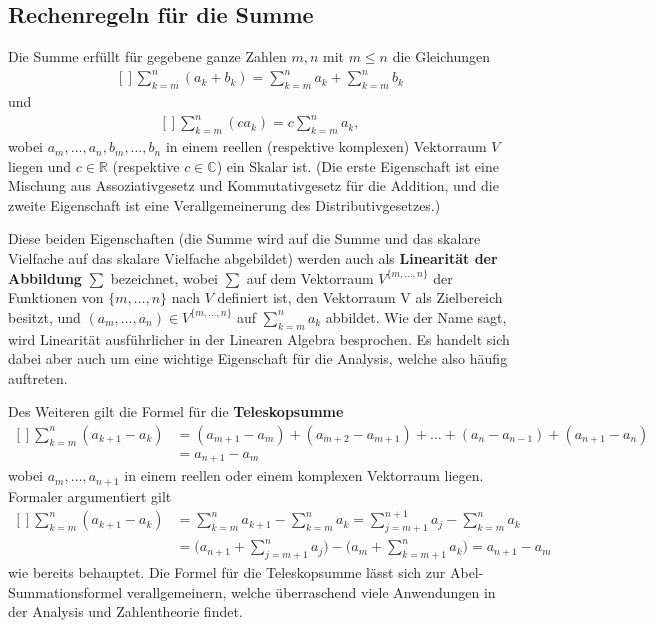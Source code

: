 \documentclass[../Analysis1_script.tex]{subfiles}
\begin{document}
\subsection{Rechenregeln für die Summe}

Die Summe erfüllt für gegebene ganze Zahlen $m,n$ mit $m \leq n$ die Gleichungen
\[\begin{aligned}[]
	\sum _{k=m}^n(a_k+b_k) = \sum _{k=m}^na_k + \sum _{k=m}^nb_k
\end{aligned}\]
und
\[\begin{aligned}[]
	\sum _{k=m}^n(ca_k) = c \sum _{k=m}^na_k,
\end{aligned}\] 
wobei $a_m,\ldots ,a_n, b_m,\ldots ,b_n$ in einem reellen (respektive komplexen) Vektorraum $V$ liegen und $c\in \mathbb {R}$ (respektive $c\in \mathbb {C}$) ein Skalar ist. (Die erste Eigenschaft ist eine Mischung aus Assoziativgesetz und Kommutativgesetz für die Addition, und die zweite Eigenschaft ist eine Verallgemeinerung des Distributivgesetzes.)

Diese beiden Eigenschaften (die Summe wird auf die Summe und das skalare Vielfache auf das skalare Vielfache abgebildet) werden auch als \textbf{Linearität der Abbildung} $\sum$ bezeichnet, wobei $\sum$ auf dem Vektorraum $V^{\{ m,\ldots ,n\} }$ der Funktionen von $\{ m,\ldots ,n\}$ nach $V$ definiert ist, den Vektorraum V als Zielbereich besitzt, und $(a_m,\ldots ,a_n)\in V^{\{ m,\ldots ,n\} }$ auf $\sum _{k=m}^na_k$ abbildet. Wie der Name sagt, wird Linearität ausführlicher in der Linearen Algebra besprochen. Es handelt sich dabei aber auch um eine wichtige Eigenschaft für die Analysis, welche also häufig auftreten.

Des Weiteren gilt die Formel für die \textbf{Teleskopsumme}
\[\begin{aligned}[]
	\sum _{k=m}^n(a_{k+1}-a_k) &= (a_{m+1}-a_m) + (a_{m+2}-a_{m+1})+\ldots + (a_n-a_{n-1})+(a_{n+1}-a_n)\\ 
	&= a_{n+1}-a_m
\end{aligned}\] 
wobei $a_m,\ldots ,a_{n+1}$ in einem reellen oder einem komplexen Vektorraum liegen. Formaler argumentiert gilt
\[\begin{aligned}[]
	\sum _{k=m}^n(a_{k+1}-a_k) &= \sum _{k=m}^na_{k+1}-\sum _{k=m}^na_k = \sum _{j=m+1}^{n+1}a_j - \sum _{k=m}^n a_k\\ 
	&= \Bigg (a_{n+1}+ \sum _{j=m+1}^na_j\Bigg ) - \Bigg (a_m + \sum _{k=m+1}^na_k\Bigg ) = a_{n+1}-a_m
\end{aligned}\] 
wie bereits behauptet. Die Formel für die Teleskopsumme lässt sich zur Abel-Summationsformel verallgemeinern, welche überraschend viele Anwendungen in der Analysis und Zahlentheorie findet.
\end{document}
